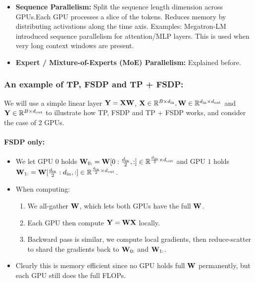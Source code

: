 \documentclass[11pt]{article}  %
\begin{document}
\begin{itemize}
  \item  \textbf{Sequence Parallelism:} Split the sequence length dimension across GPUs.Each GPU processes a slice of the tokens. Reduces memory by distributing activations along the time axis.
  Examples: Megatron-LM introduced sequence parallelism for attention/MLP layers.
  This is used when very long context windows are present.

  \item \textbf{Expert / Mixture-of-Experts (MoE) Parallelism:} Explained before.
\end{itemize}


\subsubsection{An example of TP, FSDP and TP + FSDP:}
We will use a simple linear layer $\mathbf{Y} = \mathbf{X}\mathbf{W}$, $\mathbf{X} \in \mathbb{R}^{B \times d_{\text{in}}}, \mathbf{W} \in \mathbb{R}^{d_{\text{in}} \times d_{\text{out}}}$ and $\mathbf{Y} \in \mathbb{R}^{B \times d_{\text{out}}}$ to illustrate how TP, FSDP and TP + FSDP works, and consider the case of $2$ GPUs.

\paragraph{FSDP only:}
\begin{itemize}
  \item We let GPU $0$ holds $\mathbf{W}_{0:} = \mathbf{W}[0:\frac{d_{\text{in}}}{2}, :] \in \mathbb{R}^{\frac{d_{\text{in}}}{2} \times d_{\text{out}}}$ and GPU $1$ holds $\mathbf{W}_{1:} = \mathbf{W}[\frac{d_{\text{in}}}{2}:d_{\text{in}}, :] \in \mathbb{R}^{\frac{d_{\text{in}}}{2} \times d_{\text{out}}}$.
  \item When computing:
  \begin{enumerate}
    \item We all-gather $\mathbf{W}$, which lets both GPUs have the full $\mathbf{W}$.
    \item Each GPU then compute $\mathbf{Y} = \mathbf{W}\mathbf{X}$ locally.
    \item Backward pass is similar, we compute local gradients, then reduce-scatter to shard the gradients back to $\mathbf{W}_{0:}$ and $\mathbf{W}_{1:}$.
  \end{enumerate}

  \item Clearly this is memory efficient since no GPU holds full $\mathbf{W}$ permanently, but each GPU still does the full FLOPs.
\end{itemize}
\end{document}
